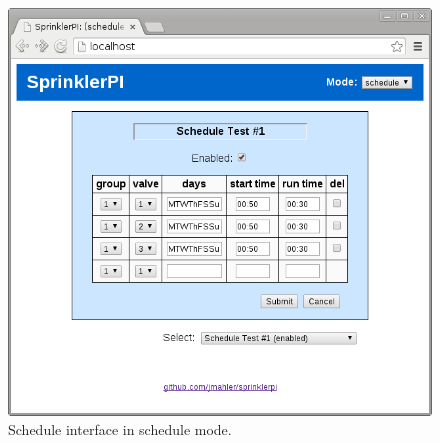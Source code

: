 \documentclass{article}
\begin{document}
\begin{figure}[h!]
\begin{center}
\includegraphics[scale=0.50]{../testing/img/www-schedule_test1.png}
\end{center}
\caption{Schedule interface in schedule mode.}
\label{fig:wwwsched}
\end{figure}


\pagebreak
\glsaddall
\printglossaries

\clearpage
\printbibliography[heading=bibintoc]
\end{document}
